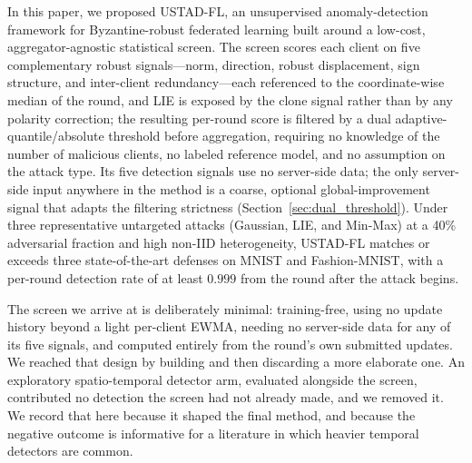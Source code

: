 \documentclass[journal]{IEEEtran}
\begin{document}
In this paper, we proposed USTAD-FL, an unsupervised anomaly-detection framework for Byzantine-robust federated learning built around a low-cost, aggregator-agnostic statistical screen. The screen scores each client on five complementary robust signals---norm, direction, robust displacement, sign structure, and inter-client redundancy---each referenced to the coordinate-wise median of the round, and LIE is exposed by the clone signal rather than by any polarity correction; the resulting per-round score is filtered by a dual adaptive-quantile/absolute threshold before aggregation, requiring no knowledge of the number of malicious clients, no labeled reference model, and no assumption on the attack type. Its five detection signals use no server-side data; the only server-side input anywhere in the method is a coarse, optional global-improvement signal that adapts the filtering strictness (Section~\ref{sec:dual_threshold}). Under three representative untargeted attacks (Gaussian, LIE, and Min-Max) at a 40\% adversarial fraction and high non-IID heterogeneity, USTAD-FL matches or exceeds three state-of-the-art defenses on MNIST and Fashion-MNIST, with a per-round detection rate of at least $0.999$ from the round after the attack begins.

The screen we arrive at is deliberately minimal: training-free, using no update history beyond a light per-client EWMA, needing no server-side data for any of its five signals, and computed entirely from the round's own submitted updates. We reached that design by building and then discarding a more elaborate one. An exploratory spatio-temporal detector arm, evaluated alongside the screen, contributed no detection the screen had not already made, and we removed it. We record that here because it shaped the final method, and because the negative outcome is informative for a literature in which heavier temporal detectors are common.
\end{document}
